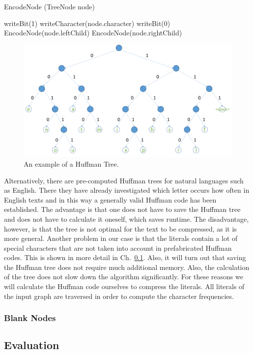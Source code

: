 \begin{algorithm}
	\caption{EncodeNode (TreeNode node)}\label{alg:HuffmanEncode}
	\begin{algorithmic}[1]
			\State writeBit(1)
			\State writeCharacter(node.character)
		\Else
			\State writeBit(0)
			\State EncodeNode(node.leftChild)
			\State EncodeNode(node.rightChild)
		\EndIf
	\end{algorithmic}
\end{algorithm}

\begin{figure}
	\centering
	\includegraphics[width=0.9\linewidth]{figures/4_rdf_specific_features/huffman}
	\caption{An example of a Huffman Tree.}
	\label{fig:huffmantree}
\end{figure}


Alternatively, there are pre-computed Huffman trees for natural languages such as English. There they have already investigated which letter occurs how often in English texts and in this way a generally valid Huffman code has been established. The advantage is that one does not have to save the Huffman tree and does not have to calculate it oneself, which saves runtime. The disadvantage, however, is that the tree is not optimal for the text to be compressed, as it is more general. Another problem in our case is that the literals contain a lot of special characters that are not taken into account in prefabricated Huffman codes. This is shown in more detail in Ch.~\ref{sec:evalDict}. Also, it will turn out that saving the Huffman tree does not require much additional memory. Also, the calculation of the tree does not slow down the algorithm significantly. For these reasons we will calculate the Huffman code ourselves to compress the literals. All literals of the input graph are traversed in order to compute the character frequencies.

\subsubsection{Blank Nodes}










\subsection{Evaluation}\label{sec:evalDict}



